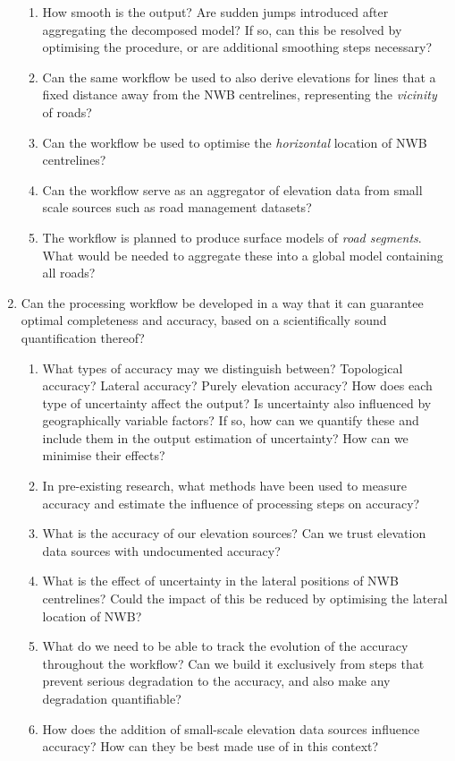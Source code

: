 \begin{enumerate}
\begin{enumerate}
        \item How smooth is the output? Are sudden jumps introduced after aggregating the decomposed model? If so, can this be resolved by optimising the procedure, or are additional smoothing steps necessary?
        \item Can the same workflow be used to also derive elevations for lines that a fixed distance away from the NWB centrelines, representing the \textit{vicinity} of roads?
        \item Can the workflow be used to optimise the \textit{horizontal} location of NWB centrelines?
        \item Can the workflow serve as an aggregator of elevation data from small scale sources such as road management datasets?
        \item The workflow is planned to produce surface models of \textit{road segments}. What would be needed to aggregate these into a global model containing all roads?
    \end{enumerate}
    \item Can the processing workflow be developed in a way that it can guarantee optimal completeness and accuracy, based on a scientifically sound quantification thereof?
    \begin{enumerate}
        \item What types of accuracy may we distinguish between? Topological accuracy? Lateral accuracy? Purely elevation accuracy? How does each type of uncertainty affect the output? Is uncertainty also influenced by geographically variable factors? If so, how can we quantify these and include them in the output estimation of uncertainty? How can we minimise their effects?
        \item In pre-existing research, what methods have been used to measure accuracy and estimate the influence of processing steps on accuracy?
        \item What is the accuracy of our elevation sources? Can we trust elevation data sources with undocumented accuracy?
        \item What is the effect of uncertainty in the lateral positions of NWB centrelines? Could the impact of this be reduced by optimising the lateral location of NWB?
        \item What do we need to be able to track the evolution of the accuracy throughout the workflow? Can we build it exclusively from steps that prevent serious degradation to the accuracy, and also make any degradation quantifiable?
        \item How does the addition of small-scale elevation data sources influence accuracy? How can they be best made use of in this context?

\end{enumerate}
\end{enumerate}
